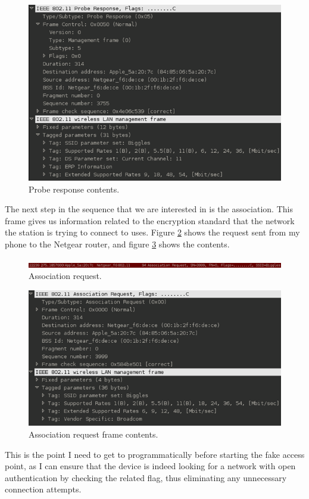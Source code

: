 \begin{figure}[h!]
\includegraphics[width=\linewidth]{research/80211/figures/bt65.png}
\caption{Probe response contents.}
\label{research:80211:bt65}
\end{figure}

The next step in the sequence that we are interested in is the association. This frame gives us information related to the encryption standard that the network the station is trying to connect to uses. Figure \ref{research:80211:bt7} shows the request sent from my phone to the Netgear router, and figure \ref{research:80211:bt8} shows the contents.

\begin{figure}[h!]
\includegraphics[width=\linewidth]{research/80211/figures/bt7.png}
\caption{Association request.}
\label{research:80211:bt7}
\end{figure}
\clearpage
\begin{figure}[h!]
\includegraphics[width=\linewidth]{research/80211/figures/bt8.png}
\caption{Association request frame contents.}
\label{research:80211:bt8}
\end{figure}

This is the point I need to get to programmatically before starting the fake access point, as I can ensure that the device is indeed looking for a network with open authentication by checking the related flag, thus eliminating any unnecessary connection attempts.